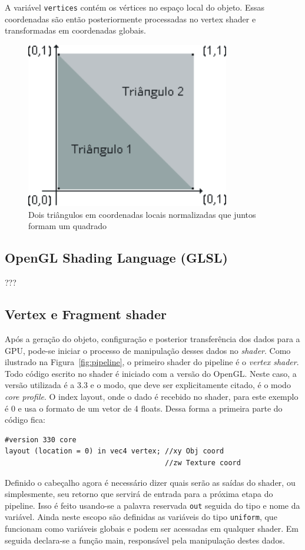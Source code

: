 \documentclass[12pt, 
openright, 
oneside, 
a4paper,    
brazil]{facom-ufu-abntex2}
\begin{document}
A variável \texttt{vertices} contém os vértices no espaço local do objeto. Essas coordenadas são então posteriormente processadas no vertex shader e transformadas em coordenadas globais.
\begin{figure}[H]
	\centering
	\includegraphics[width=24em]{imagens/tringulosCompondoQuad.png}
	\caption{Dois triângulos em coordenadas locais normalizadas que juntos formam um quadrado}
\end{figure}

\subsection{OpenGL Shading Language (GLSL)}
???

\subsection{Vertex e Fragment shader}
Após a geração do objeto, configuração e posterior transferência dos dados para a GPU, pode-se iniciar o processo de manipulação desses dados no \textit{shader}. Como ilustrado na Figura~\ref{fig:pipeline}, o primeiro shader do pipeline é o \textit{vertex shader}. Todo código escrito no shader é iniciado com a versão do OpenGL. Neste caso, a versão utilizada é a 3.3 e o modo, que deve ser explicitamente citado, é o modo \textit{core profile}.
O index layout, onde o dado é recebido no shader, para este exemplo é 0 e usa o formato de um vetor de 4 floats. Dessa forma a primeira parte do código fica:
\begin{lstlisting}[caption=Vertex shader header]
#version 330 core
layout (location = 0) in vec4 vertex; //xy Obj coord
									  //zw Texture coord
\end{lstlisting}

Definido o cabeçalho agora é necessário dizer quais serão as saídas do shader, ou simplesmente, seu retorno que servirá de entrada para a próxima etapa do pipeline. Isso é feito usando-se a palavra reservada \texttt{out} seguida do tipo e nome da variável. Ainda neste escopo são definidas as variáveis do tipo \texttt{uniform}, que funcionam como variáveis globais e podem ser acessadas em qualquer shader. Em seguida declara-se a função main, responsável pela manipulação destes dados.
\end{document}
